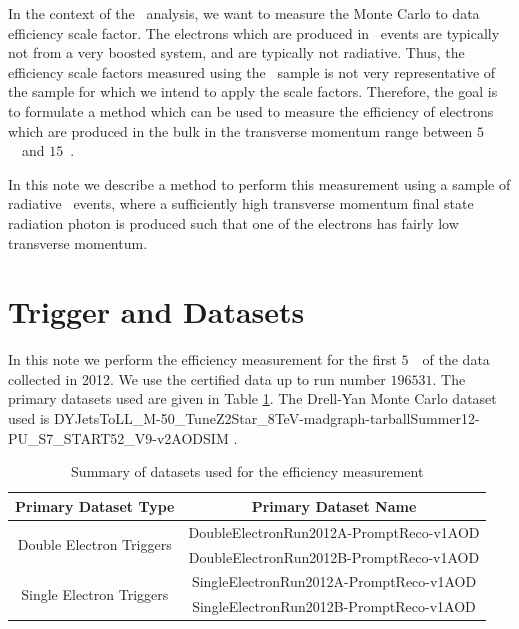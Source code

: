 \documentclass{cmspaper}
\begin{document}
In the context of the \HiggsToZZ\ analysis, we want to measure the Monte Carlo to data efficiency scale factor.
The electrons which are produced in \HiggsToZZ\ events are typically not from a very boosted system, and 
are typically not radiative. Thus, the efficiency scale factors measured using the \ZToEE\ sample is not very representative
of the sample for which we intend to apply the scale factors. Therefore, the goal is to formulate a method 
which can be used to measure the efficiency of electrons which are produced in the bulk 
in the transverse momentum range between $5$~\GeV\ and $15$~\GeV .  

In this note we describe a method to perform this measurement using a sample of radiative
\ZToEEGamma\ events, where a sufficiently high transverse momentum final state radiation 
photon is produced such that one of the electrons has fairly low transverse momentum. 


\section{Trigger and Datasets}

In this note we perform the efficiency measurement for the first $5$~\ifb\ of the data
collected in 2012. We use the certified data up to run number $196531$.
The primary datasets used are given in Table \ref{tab:primarydatasets}.
The Drell-Yan Monte Carlo dataset used is \/DYJetsToLL\_M-50\_TuneZ2Star\_8TeV-madgraph-tarball\/Summer12-PU\_S7\_START52\_V9-v2\/AODSIM .

\begin{table}[!ht]
\begin{center}
\begin{tabular}{|c|c|}
\hline
 Primary Dataset Type                     & Primary Dataset Name                       \\
\hline 
\multirow{2}{*}{Double Electron Triggers} & \/DoubleElectron\/Run2012A-PromptReco-v1\/AOD \\
                                          & \/DoubleElectron\/Run2012B-PromptReco-v1\/AOD \\
\hline
\multirow{2}{*}{Single Electron Triggers} & \/SingleElectron\/Run2012A-PromptReco-v1\/AOD \\
                                          & \/SingleElectron\/Run2012B-PromptReco-v1\/AOD \\
\hline
\end{tabular}
\caption{Summary of datasets used for the efficiency measurement
  \label{tab:primarydatasets}
}
\end{center}
\end{table}
\end{document}

